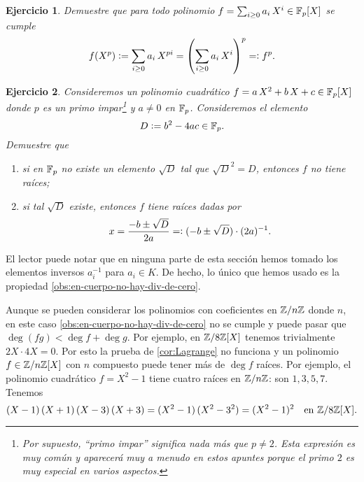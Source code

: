 \documentclass{article}
\theoremstyle{plain}
\newtheorem{ejerc}{Ejercicio}
\begin{document}
\begin{ejerc}
  Demuestre que para todo polinomio $f = \sum_{i\ge 0} a_i\,X^i \in \mathbb{F}_p [X]$
  se cumple
  $$f (X^p) \mathrel{\mathop:}= \sum_{i\ge 0} a_i\,X^{pi}
        = \left(\sum_{i\ge 0} a_i\,X^i\right)^p =\mathrel{\mathop:} f^p.$$
\end{ejerc}

\begin{ejerc}
  \label{ejerc:discr}
  Consideremos un polinomio cuadrático $f = a\,X^2 + b\,X + c \in \mathbb{F}_p [X]$
  donde $p$ es un primo impar\footnote{Por supuesto, ``primo impar'' significa
    nada más que $p \ne 2$. Esta expresión es muy común y aparecerá muy a menudo
    en estos apuntes porque el primo $2$ es muy especial en varios aspectos.} y
  $a \ne 0$ en $\mathbb{F}_p$. Consideremos el elemento
  $$D \mathrel{\mathop:}= b^2 - 4ac \in \mathbb{F}_p.$$
  Demuestre que

  \begin{enumerate}
  \item[1)] si en $\mathbb{F}_p$ no existe un elemento $\sqrt{D}$ tal que
    $\sqrt{D}^2 = D$, entonces $f$ no tiene raíces;

  \item[2)] si tal $\sqrt{D}$ existe, entonces $f$ tiene raíces dadas por
    $$x = \frac{-b \pm \sqrt{D}}{2a} =\mathrel{\mathop:} (-b \pm\sqrt{D})\cdot (2a)^{-1}.$$
  \end{enumerate}
\end{ejerc}

\begin{digresion}
  El lector puede notar que en ninguna parte de esta sección hemos tomado los
  elementos inversos $a_i^{-1}$ para $a_i\in K$. De hecho, lo único que hemos
  usado es la propiedad \ref{obs:en-cuerpo-no-hay-div-de-cero}.

  Aunque se pueden considerar los polinomios con coeficientes en $\mathbb{Z}/n\mathbb{Z}$
  donde $n$, en este caso \ref{obs:en-cuerpo-no-hay-div-de-cero} no se cumple y
  puede pasar que $\deg (fg) < \deg f + \deg g$. Por ejemplo, en $\mathbb{Z}/8\mathbb{Z} [X]$
  tenemos trivialmente $2X \cdot 4X = 0$. Por esto la prueba de
  \ref{cor:Lagrange} no funciona y un polinomio $f\in \mathbb{Z}/n\mathbb{Z} [X]$ con $n$
  compuesto puede tener más de $\deg f$ raíces. Por ejemplo, el polinomio
  cuadrático $f = X^2 - 1$ tiene cuatro raíces en $\mathbb{Z}/n\mathbb{Z}$: son
  $1,3,5,7$. Tenemos
  \[ (X - 1)\,(X + 1)\,(X - 3)\,(X + 3) = (X^2 - 1)\,(X^2 - 3^2) = (X^2 - 1)^2
         \quad\text{en }\mathbb{Z}/8\mathbb{Z}[X]. \]
\end{digresion}

\end{document}
